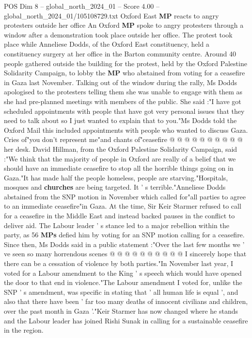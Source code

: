 \begin{textsample}{POS Dim 8 – global\_north\_2024\_01 – Score 4.00 – global\_north\_2024\_01/105108729.txt}  \label{ex:f8_pos_238}
Oxford East \textbf{MP} reacts to angry protesters outside her office An Oxford \textbf{MP} spoke to angry protesters through a window after a demonstration took place outside her office.
The protest took place while Anneliese Dodds, of the Oxford East constituency, held a constituency surgery at her office in the Barton community centre.
Around 40 people gathered outside the building for the protest, held by the Oxford Palestine Solidarity Campaign, to lobby the \textbf{MP} who abstained from voting for a ceasefire in Gaza last November.
Talking out of the window during the rally, Ms Dodds apologised to the protesters telling them she was unable to engage with them as she had pre-planned meetings with members of the public.
She said :"I have got scheduled appointments with people that have got very personal issues that they need to talk about so I just wanted to explain that to you."Ms Dodds told the Oxford Mail this included appointments with people who wanted to discuss Gaza.
Cries of"you don't represent me"and chants of"ceasefire @ @ @ @ @ @ @ @ @ @ her desk.
David Hillman, from the Oxford Palestine Solidarity Campaign, said :"We think that the majority of people in Oxford are really of a belief that we should have an immediate ceasefire to stop all the horrible things going on in Gaza."It has made half the people homeless, people are starving."Hospitals, mosques and \textbf{churches} are being targeted.
It ' s terrible."Anneliese Dodds abstained from the SNP motion in November which called for"all parties to agree to an immediate ceasefire"in Gaza.
At the time, Sir Keir Starmer refused to call for a ceasefire in the Middle East and instead backed pauses in the conflict to deliver aid.
The Labour leader ' s stance led to a major rebellion within the party, as 56 \textbf{MPs} defied him by voting for an SNP motion calling for a ceasefire.
Since then, Ms Dodds said in a public statement :"Over the last few months we ' ve seen so many horrendous scenes @ @ @ @ @ @ @ @ @ @ I sincerely hope that there can be a cessation of violence by both parties."In November last year, I voted for a Labour amendment to the King ' s speech which would have opened the door to that end in violence."The Labour amendment I voted for, unlike the SNP ' s amendment, was specific in stating that ' all human life is equal ', and also that there have been ' far too many deaths of innocent civilians and children, over the past month in Gaza '."Keir Starmer has now changed where he stands and the Labour leader has joined Rishi Sunak in calling for a sustainable ceasefire in the region.

\end{textsample}
